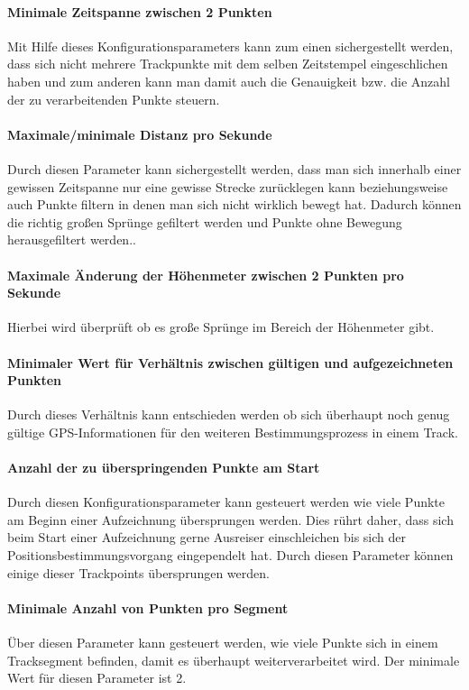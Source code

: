 \paragraph{Minimale Zeitspanne zwischen 2 Punkten} Mit Hilfe dieses Konfigurationsparameters kann zum einen sichergestellt werden, dass sich nicht mehrere Trackpunkte mit dem selben Zeitstempel eingeschlichen haben und zum anderen kann man damit auch die Genauigkeit bzw. die Anzahl der zu verarbeitenden Punkte steuern.

\paragraph{Maximale/minimale Distanz pro Sekunde} Durch diesen Parameter kann sichergestellt werden, dass man sich innerhalb einer gewissen Zeitspanne nur eine gewisse Strecke zurücklegen kann beziehungsweise auch Punkte filtern in denen man sich nicht wirklich bewegt hat. Dadurch können die richtig großen Sprünge gefiltert werden und Punkte ohne Bewegung herausgefiltert werden..

\paragraph{Maximale Änderung der Höhenmeter zwischen 2 Punkten pro Sekunde} Hierbei wird überprüft ob es große Sprünge im Bereich der Höhenmeter gibt. 

\paragraph{Minimaler Wert für Verhältnis zwischen gültigen und aufgezeichneten Punkten} Durch dieses Verhältnis kann entschieden werden ob sich überhaupt noch genug gültige GPS-Informationen für den weiteren Bestimmungsprozess in einem Track.

\paragraph{Anzahl der zu überspringenden Punkte am Start} Durch diesen Konfigurationsparameter kann gesteuert werden wie viele Punkte am Beginn einer Aufzeichnung übersprungen werden. Dies rührt daher, dass sich beim Start einer Aufzeichnung gerne Ausreiser einschleichen bis sich der Positionsbestimmungsvorgang eingependelt hat. Durch diesen Parameter können einige dieser Trackpoints übersprungen werden.

\paragraph{Minimale Anzahl von Punkten pro Segment} Über diesen Parameter kann gesteuert werden, wie viele Punkte sich in einem Tracksegment befinden, damit es überhaupt weiterverarbeitet wird. Der minimale Wert für diesen Parameter ist 2. 

